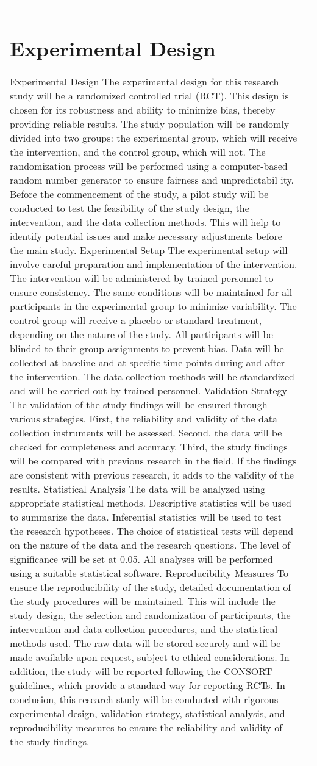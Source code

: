 \documentclass[conference]{IEEEtran}
\begin{document}
\begin{table}[htbp]
\begin{tabular}{|l|c|}
\section{Experimental Design}
Experimental Design The experimental design for this research study will be a randomized controlled trial (RCT). This design is chosen for its robustness and ability to minimize bias, thereby providing reliable results. The study population will be randomly divided into two groups: the experimental group, which will receive the intervention, and the control group, which will not. The randomization process will be performed using a computer-based random number generator to ensure fairness and unpredictabil ity. Before the commencement of the study, a pilot study will be conducted to test the feasibility of the study design, the intervention, and the data collection methods. This will help to identify potential issues and make necessary adjustments before the main study. Experimental Setup The experimental setup will involve careful preparation and implementation of the intervention. The intervention will be administered by trained personnel to ensure consistency. The same conditions will be maintained for all participants in the experimental group to minimize variability. The control group will receive a placebo or standard treatment, depending on the nature of the study. All participants will be blinded to their group assignments to prevent bias. Data will be collected at baseline and at specific time points during and after the intervention. The data collection methods will be standardized and will be carried out by trained personnel. Validation Strategy The validation of the study findings will be ensured through various strategies. First, the reliability and validity of the data collection instruments will be assessed. Second, the data will be checked for completeness and accuracy. Third, the study findings will be compared with previous research in the field. If the findings are consistent with previous research, it adds to the validity of the results. Statistical Analysis The data will be analyzed using appropriate statistical methods. Descriptive statistics will be used to summarize the data. Inferential statistics will be used to test the research hypotheses. The choice of statistical tests will depend on the nature of the data and the research questions. The level of significance will be set at 0.05. All analyses will be performed using a suitable statistical software. Reproducibility Measures To ensure the reproducibility of the study, detailed documentation of the study procedures will be maintained. This will include the study design, the selection and randomization of participants, the intervention and data collection procedures, and the statistical methods used. The raw data will be stored securely and will be made available upon request, subject to ethical considerations. In addition, the study will be reported following the CONSORT guidelines, which provide a standard way for reporting RCTs. In conclusion, this research study will be conducted with rigorous experimental design, validation strategy, statistical analysis, and reproducibility measures to ensure the reliability and validity of the study findings.


\end{tabular}
\end{table}
\end{document}
